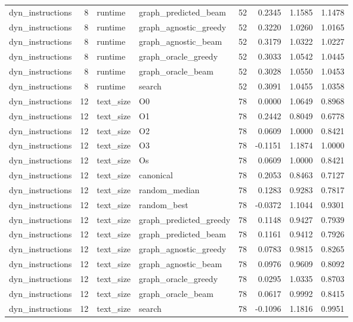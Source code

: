 \begin{table}[t]
\begin{tabular}{lrllrrrr}
dyn\_instructions & 8 & runtime & graph\_predicted\_beam & 52 & 0.2345 & 1.1585 & 1.1478 \\
dyn\_instructions & 8 & runtime & graph\_agnostic\_greedy & 52 & 0.3220 & 1.0260 & 1.0165 \\
dyn\_instructions & 8 & runtime & graph\_agnostic\_beam & 52 & 0.3179 & 1.0322 & 1.0227 \\
dyn\_instructions & 8 & runtime & graph\_oracle\_greedy & 52 & 0.3033 & 1.0542 & 1.0445 \\
dyn\_instructions & 8 & runtime & graph\_oracle\_beam & 52 & 0.3028 & 1.0550 & 1.0453 \\
dyn\_instructions & 8 & runtime & search & 52 & 0.3091 & 1.0455 & 1.0358 \\
dyn\_instructions & 12 & text\_size & O0 & 78 & 0.0000 & 1.0649 & 0.8968 \\
dyn\_instructions & 12 & text\_size & O1 & 78 & 0.2442 & 0.8049 & 0.6778 \\
dyn\_instructions & 12 & text\_size & O2 & 78 & 0.0609 & 1.0000 & 0.8421 \\
dyn\_instructions & 12 & text\_size & O3 & 78 & -0.1151 & 1.1874 & 1.0000 \\
dyn\_instructions & 12 & text\_size & Os & 78 & 0.0609 & 1.0000 & 0.8421 \\
dyn\_instructions & 12 & text\_size & canonical & 78 & 0.2053 & 0.8463 & 0.7127 \\
dyn\_instructions & 12 & text\_size & random\_median & 78 & 0.1283 & 0.9283 & 0.7817 \\
dyn\_instructions & 12 & text\_size & random\_best & 78 & -0.0372 & 1.1044 & 0.9301 \\
dyn\_instructions & 12 & text\_size & graph\_predicted\_greedy & 78 & 0.1148 & 0.9427 & 0.7939 \\
dyn\_instructions & 12 & text\_size & graph\_predicted\_beam & 78 & 0.1161 & 0.9412 & 0.7926 \\
dyn\_instructions & 12 & text\_size & graph\_agnostic\_greedy & 78 & 0.0783 & 0.9815 & 0.8265 \\
dyn\_instructions & 12 & text\_size & graph\_agnostic\_beam & 78 & 0.0976 & 0.9609 & 0.8092 \\
dyn\_instructions & 12 & text\_size & graph\_oracle\_greedy & 78 & 0.0295 & 1.0335 & 0.8703 \\
dyn\_instructions & 12 & text\_size & graph\_oracle\_beam & 78 & 0.0617 & 0.9992 & 0.8415 \\
dyn\_instructions & 12 & text\_size & search & 78 & -0.1096 & 1.1816 & 0.9951 \\

\end{tabular}
\end{table}
